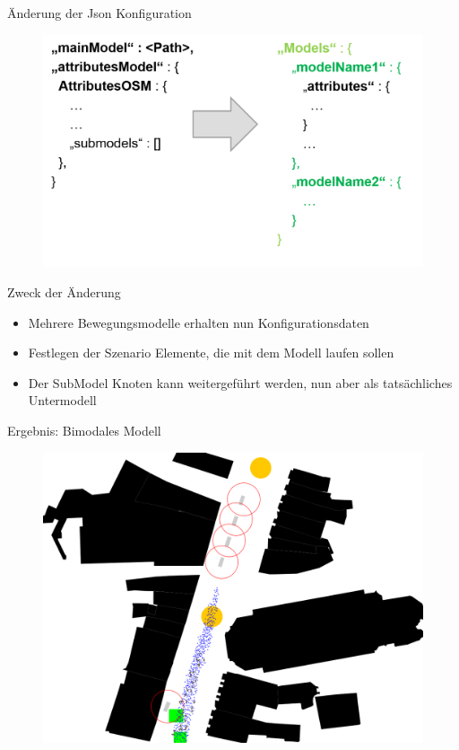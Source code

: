 \begin{frame}{Änderung der Json Konfiguration}
	\begin{figure}
		\includegraphics[width=\textwidth, height=0.8\textwidth, keepaspectratio]{appendix/images/JsonChange.png}
	\end{figure}
\end{frame}

\begin{frame}{Zweck der Änderung}
	\begin{itemize}
		\item	Mehrere Bewegungsmodelle erhalten nun Konfigurationsdaten
		\item Festlegen der Szenario Elemente, die mit dem Modell laufen sollen
		\item Der SubModel Knoten kann weitergeführt werden, nun aber als tatsächliches Untermodell
	\end{itemize}
\end{frame}

\begin{frame}{Ergebnis: Bimodales Modell}
	\begin{figure}
		\includegraphics[width=\textwidth, height=0.7\textwidth, keepaspectratio]{appendix/images/landshutbimodal.png}
	\end{figure}
\end{frame}

